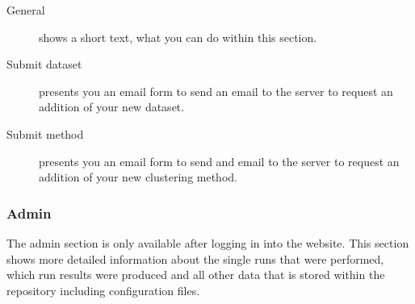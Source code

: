 	\begin{description}
		\item[General] shows a short text, what you can do within this section.
		\item[Submit dataset] presents you an email form to send an email to the \clusteval server to request an addition of your new dataset.
		\item[Submit method] presents you an email form to send and email to the \clusteval server to request an addition of your new clustering method.
	\end{description}
	\subsubsection{Admin}
	The admin section is only available after logging in into the website. This section shows more detailed information about the single runs that were performed, which run results were produced and all other data that is stored within the repository including configuration files.
